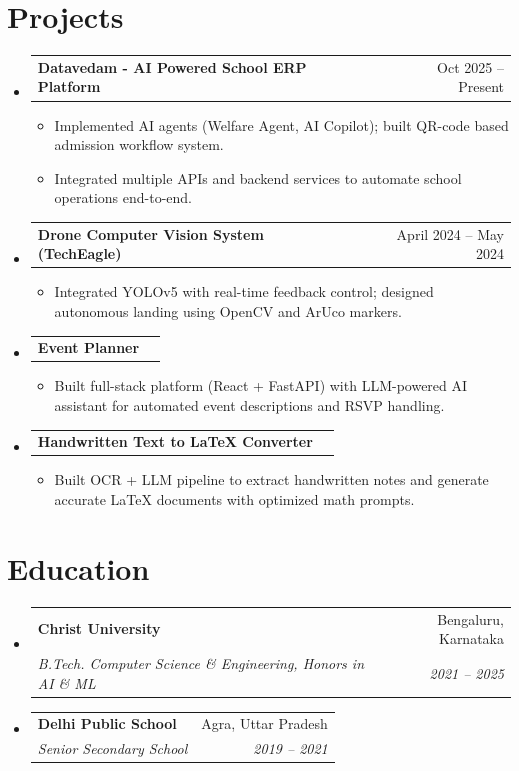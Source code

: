 \documentclass[letterpaper,10pt]{article}
\makeatletter
\newcommand{\resumeItem}[1]{
  \item\small{
    {#1 \vspace{-1pt}}
  }
}
\newcommand{\resumeSubheading}[4]{
  \vspace{-1pt}\item
    \begin{tabular*}{0.97\textwidth}[t]{l@{\extracolsep{\fill}}r}
      \textbf{#1} & #2 \\
      \textit{\small #3} & \textit{\small #4} \\
    \end{tabular*}\vspace{-5pt}
}
\newcommand{\resumeProjectHeading}[2]{
    \item
    \begin{tabular*}{0.97\textwidth}{l@{\extracolsep{\fill}}r}
      \small#1 & #2 \\
    \end{tabular*}\vspace{-1pt}
}
\newcommand{\resumeSubHeadingListStart}{\begin{itemize}[leftmargin=0.15in, label={}]}
\newcommand{\resumeSubHeadingListEnd}{\end{itemize}\vspace{-5pt}}
\newcommand{\resumeItemListStart}{\begin{itemize}\vspace{-3pt}}
\newcommand{\resumeItemListEnd}{\end{itemize}\vspace{-2pt}}
\makeatother
\begin{document}
\section{Projects}
\resumeSubHeadingListStart
    \resumeProjectHeading
      {\textbf{Datavedam - AI Powered School ERP Platform}}{Oct 2025 -- Present}
      \resumeItemListStart
        \resumeItem{Implemented AI agents (Welfare Agent, AI Copilot); built QR-code based admission workflow system.}
        \resumeItem{Integrated multiple APIs and backend services to automate school operations end-to-end.}
      \resumeItemListEnd
    \resumeProjectHeading
      {\textbf{Drone Computer Vision System (TechEagle)}}{April 2024 -- May 2024}
      \resumeItemListStart
        \resumeItem{Integrated YOLOv5 with real-time feedback control; designed autonomous landing using OpenCV and ArUco markers.}
      \resumeItemListEnd
    \resumeProjectHeading
      {\textbf{Event Planner}}{}
      \resumeItemListStart
        \resumeItem{Built full-stack platform (React + FastAPI) with LLM-powered AI assistant for automated event descriptions and RSVP handling.}
      \resumeItemListEnd
    \resumeProjectHeading
      {\textbf{Handwritten Text to LaTeX Converter}}{}
      \resumeItemListStart
        \resumeItem{Built OCR + LLM pipeline to extract handwritten notes and generate accurate LaTeX documents with optimized math prompts.}
      \resumeItemListEnd
\resumeSubHeadingListEnd

\section{Education}
\resumeSubHeadingListStart
    \resumeSubheading
      {Christ University}{Bengaluru, Karnataka}
      {B.Tech. Computer Science \& Engineering, Honors in AI \& ML}{2021 -- 2025}
    \resumeSubheading
      {Delhi Public School}{Agra, Uttar Pradesh}
      {Senior Secondary School}{2019 -- 2021}
\resumeSubHeadingListEnd
\end{document}

